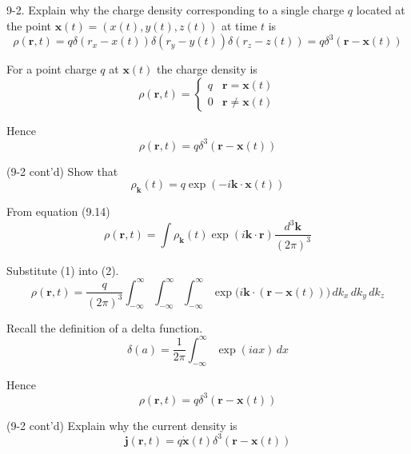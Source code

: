 \documentclass[12pt]{article}
\begin{document}
9-2.
Explain why the charge density corresponding to a single
charge $q$ located at the point $\mathbf x(t)=(x(t),y(t),z(t))$
at time $t$ is
\begin{equation*}
\rho(\mathbf r,t)=q
\delta(r_x-x(t))
\delta(r_y-y(t))
\delta(r_z-z(t))
=q\delta^3(\mathbf r-\mathbf x(t))
\end{equation*}

For a point charge $q$ at $\mathbf x(t)$ the charge density is
\begin{equation*}
\rho(\mathbf r,t)
=\begin{cases}
q & \mathbf r=\mathbf x(t)
\\
0 & \mathbf r\ne\mathbf x(t)
\end{cases}
\end{equation*}

Hence
\begin{equation*}
\rho(\mathbf r,t)=q\delta^3(\mathbf r-\mathbf x(t))
\end{equation*}

(9-2 cont'd)
Show that
\begin{equation*}
\rho_{\mathbf k}(t)=q\exp(-i\mathbf k\cdot\mathbf x(t))
\tag{1}
\end{equation*}

From equation (9.14)
\begin{equation*}
\rho(\mathbf r,t)=\int\rho_{\mathbf k}(t)
\exp(i\mathbf k\cdot\mathbf r)
\frac{d^3\mathbf k}{(2\pi)^3}
\tag{2}
\end{equation*}

Substitute (1) into (2).
\begin{equation*}
\rho(\mathbf r,t)=\frac{q}{(2\pi)^3}
\int_{-\infty}^\infty
\int_{-\infty}^\infty
\int_{-\infty}^\infty
\exp\big(i\mathbf k\cdot(\mathbf r-\mathbf x(t))\big)
\,dk_x\,dk_y\,dk_z
\end{equation*}

Recall the definition of a delta function.
\begin{equation*}
\delta(a)=\frac{1}{2\pi}\int_{-\infty}^\infty\exp(iax)\,dx
\end{equation*}

Hence
\begin{equation*}
\rho(\mathbf r,t)=q\delta^3(\mathbf r-\mathbf x(t))
\end{equation*}

(9-2 cont'd)
Explain why the current density is
\begin{equation*}
\mathbf j(\mathbf r,t)=q\dot{\mathbf x}(t)\delta^3(\mathbf r-\mathbf x(t))
\end{equation*}
\end{document}
